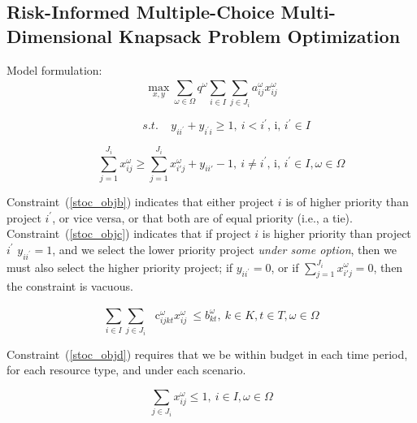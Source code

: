 \subsection{Risk-Informed Multiple-Choice Multi-Dimensional Knapsack Problem Optimization}
\label{subsec:RImckp}

Model formulation:\\

\begin{equation}\label{stoc_obja}
\mathop{\max}_{x,y} \sum _{ \omega  \in  \Omega }^{}q^{ \omega } \sum _{i \in I}^{} \sum _{j \in J_{i}}^{}a_{ij}^{ \omega }x_{ij}^{ \omega }
\end{equation}

\begin{equation}\label{stoc_objb}
~~~~~~~~~~~~s.t.~~~~~y_{ii^{'}}+y_{i^{'}i} \geq 1,~ i<i^{'}\text{, i, }i^{'} \in I
\end{equation}

\begin{equation}\label{stoc_objc}
~~~~~~~~\sum_{j=1}^{J_i} x_{ij}^\omega \geq \sum_{j=1}^{J_i} x_{i'j}^\omega + y_{ii'} -1,~ i \neq i^{'}\text{, i, }i^{'} \in I,  \omega  \in  \Omega
\end{equation}

Constraint~(\ref{stoc_objb}) indicates that either project $i$ is of higher priority
than project  $i^{'}$, or vice versa, or that both are of equal priority (i.e., a tie).
Constraint~(\ref{stoc_objc}) indicates that if project  $i$  is higher priority than
project  $i^{'}$  $y_{ii^{'}}=1$, and we select the lower priority project
\textit{under some option}, then we must also select the higher priority project;
if  $y_{ii^{'}}=0$,  or if  $\sum_{j=1}^{J_i} x_{i'j}^\omega=0$,  then the constraint is vacuous.\par

\begin{equation}\label{stoc_objd}
 \sum _{i \in I}^{} \sum _{j \in J_{i}}^{}\text{~ c}_{ijkt}^{ \omega }x_{ij}^{ \omega }~  \leq  b_{kt}^{ \omega },~ k \in K, t \in T,  \omega  \in  \Omega
\end{equation}

Constraint~(\ref{stoc_objd}) requires that we be within budget in each time period,
for each resource type, and under each scenario.

\begin{equation}\label{stoc_obje}
\sum_{j\in J_i} x_{ij}^{ \omega } \leq 1,~ i \in I, \omega  \in  \Omega
\end{equation}

